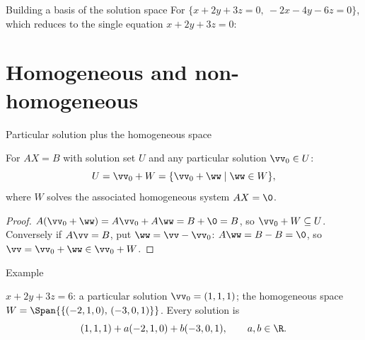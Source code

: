 \begin{frame}{Building a basis of the solution space}
For $\{x+2y+3z=0,\ -2x-4y-6z=0\}$, which reduces to the single equation $x+2y+3z=0$:

\pause

\begin{steps}
\end{steps}
\end{frame}

\section{Homogeneous and non-homogeneous}

\begin{frame}{Particular solution plus the homogeneous space}
\begin{theorem}
For $AX=B$ with solution set $U$ and any particular solution $\vv_0\in U$:
\[
U = \vv_0 + W = \{\vv_0+\ww \mid \ww\in W\},
\]
where $W$ solves the associated homogeneous system $AX=\0$.
\end{theorem}

\pause

\begin{proof}
$A(\vv_0+\ww)=A\vv_0+A\ww=B+\0=B$, so $\vv_0+W\subseteq U$. Conversely if $A\vv=B$, put $\ww=\vv-\vv_0$:
$A\ww=B-B=\0$, so $\vv=\vv_0+\ww\in\vv_0+W$.
\end{proof}
\end{frame}

\begin{frame}{Example}
\begin{example}
$x+2y+3z=6$: a particular solution $\vv_0=(1,1,1)$; the homogeneous space
$W=\Span{\{(-2,1,0),\,(-3,0,1)\}}$. Every solution is
\[
(1,1,1) + a(-2,1,0) + b(-3,0,1), \qquad a,b\in\R.
\]
\end{example}
\end{frame}

